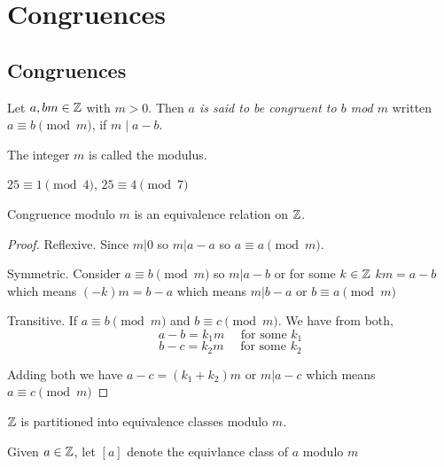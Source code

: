 \chapter{Congruences}

\section{Congruences}

\begin{definition}
    Let $a, b m \in \mathbb{Z}$   with $m > 0$. Then  \emph{$a$ is said to be congruent to $b$ mod $m$} written $a \equiv b \pmod m$, if $m \mid a - b$. 
\end{definition}

\begin{note}
 The integer $m$ is called the modulus.
\end{note}

\begin{eg}
    $25 \equiv 1 \pmod 4$, $25 \equiv 4 \pmod 7$
\end{eg}

\begin{prop}
    Congruence modulo $m$ is an equivalence relation on $\mathbb{Z}$.
\end{prop}

\begin{proof}
    Reflexive. Since $m | 0$ so  $m | a - a$ so  $a \equiv a \pmod m$.


    \vspace{1em}
    Symmetric. Consider  $a  \equiv b \pmod m$ so  $m | a- b$ or  for some  $k \in \mathbb{Z}$  $km = a -b$ which means  $(-k)m = b - a$ which means  $m | b - a$ or  $b \equiv a \pmod m$
    \vspace{1em}

    Transitive. If $a \equiv b \pmod m$ and  $ b \equiv c \pmod m$. We have from both,  
    $$ a - b= k_1m \quad \text{ for some $k_1$} $$ 
    $$ b - c= k_2m \quad \text{ for some $k_2$} $$ 

    Adding both we have  $a - c = (k_1 + k_2) m$ or $m | a - c$ which means $a \equiv c \pmod m$
\end{proof}


\begin{consequence}
    $\mathbb{Z}$ is partitioned into equivalence classes modulo $m$.
\end{consequence}
\begin{remark}
    Given $a \in \mathbb{Z}$, let  $[a]$ denote the equivlance class of $a$ modulo $m$
\end{remark}

